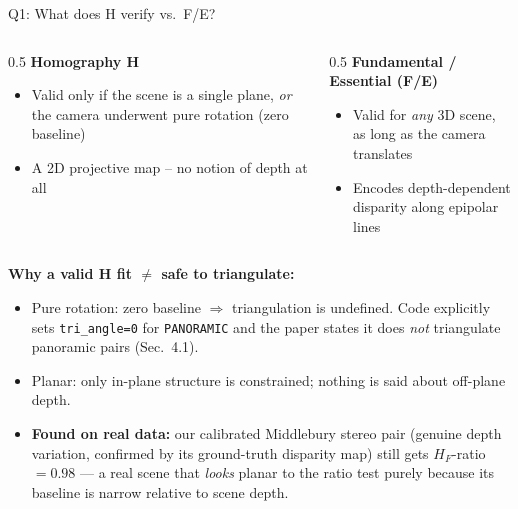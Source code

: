 \documentclass[11pt]{beamer}
\begin{document}
\begin{frame}{Q1: What does H verify vs.\ F/E?}
  \begin{columns}[T]
    \begin{column}{0.5\textwidth}
      \textbf{Homography H}
      \begin{itemize}
        \item Valid only if the scene is a single plane, \emph{or} the camera underwent pure rotation (zero baseline)
        \item A 2D projective map -- no notion of depth at all
      \end{itemize}
    \end{column}
    \begin{column}{0.5\textwidth}
      \textbf{Fundamental / Essential (F/E)}
      \begin{itemize}
        \item Valid for \emph{any} 3D scene, as long as the camera translates
        \item Encodes depth-dependent disparity along epipolar lines
      \end{itemize}
    \end{column}
  \end{columns}
  \vspace{0.3cm}
  \textbf{Why a valid H fit $\neq$ safe to triangulate:}
  \begin{itemize}
    \item Pure rotation: zero baseline $\Rightarrow$ triangulation is undefined. Code explicitly sets \texttt{tri\_angle=0} for \texttt{PANORAMIC} and the paper states it does \emph{not} triangulate panoramic pairs (Sec.~4.1).
    \item Planar: only in-plane structure is constrained; nothing is said about off-plane depth.
    \item \textbf{Found on real data:} our calibrated Middlebury stereo pair (genuine depth variation, confirmed by its ground-truth disparity map) still gets $H_F$-ratio $=0.98$ --- a real scene that \emph{looks} planar to the ratio test purely because its baseline is narrow relative to scene depth.
  \end{itemize}
\end{frame}
\end{document}
